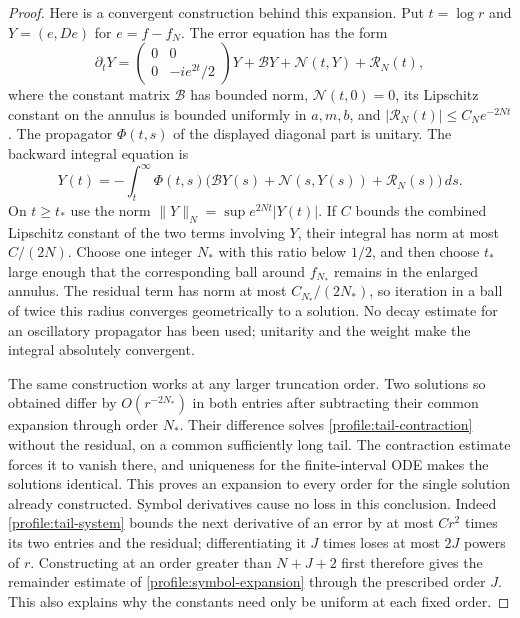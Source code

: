 \documentclass[11pt]{article}
\numberwithin{equation}{section}
\theoremstyle{definition}
\theoremstyle{remark}
\begin{document}
\begin{proof}
Here is a convergent construction behind this expansion.  Put $t=\log r$
and $Y=(e,De)$ for $e=f-f_N$.  The error equation has the form
\begin{equation}\label{profile:tail-system}
 \partial_tY=
 \begin{pmatrix}0&0\\0&-ie^{2t}/2\end{pmatrix}Y
       +\mathcal B Y+\mathcal N(t,Y)+\mathcal R_N(t),
\end{equation}
where the constant matrix $\mathcal B$ has bounded norm,
$\mathcal N(t,0)=0$, its Lipschitz constant on the annulus is bounded
uniformly in $a,m,b$, and
$|\mathcal R_N(t)|\le C_Ne^{-2Nt}$.  The propagator $\Phi(t,s)$ of the
displayed diagonal part is unitary.  The backward integral equation is
\begin{equation}\label{profile:tail-contraction}
 Y(t)=-\int_t^\infty\Phi(t,s)
       \big(\mathcal B Y(s)+\mathcal N(s,Y(s))+\mathcal R_N(s)\big)\,ds.
\end{equation}
On $t\ge t_*$ use the norm
$\|Y\|_N=\sup e^{2Nt}|Y(t)|$.  If $C$ bounds the combined Lipschitz
constant of the two terms involving $Y$, their integral has norm at
most $C/(2N)$.  Choose one integer $N_*$ with this ratio below $1/2$,
and then choose $t_*$ large enough that the corresponding ball around
$f_{N_*}$ remains in the enlarged annulus.  The residual term has norm
at most $C_{N_*}/(2N_*)$, so iteration in a ball of twice this radius
converges geometrically to a solution.  No decay estimate for an
oscillatory propagator has been used; unitarity and the weight make the
integral absolutely convergent.

The same construction works at any larger truncation order.  Two
solutions so obtained differ by $O(r^{-2N_*})$ in both entries after
subtracting their common expansion through order $N_*$.  Their
difference solves \eqref{profile:tail-contraction} without the residual,
on a common sufficiently long tail.  The contraction estimate forces
it to vanish there, and uniqueness for the finite-interval ODE makes
the solutions identical.  This proves an expansion to every order for
the single solution already constructed.  Symbol derivatives cause no
loss in this conclusion.  Indeed \eqref{profile:tail-system} bounds the
next derivative of an error by at most $C r^2$ times its two entries and
the residual; differentiating it $J$ times loses at most $2J$ powers of
$r$.  Constructing at an order greater than $N+J+2$ first therefore
gives the remainder estimate of \eqref{profile:symbol-expansion} through
the prescribed order $J$.  This also explains why the constants need
only be uniform at each fixed order.


\end{proof}
\end{document}

